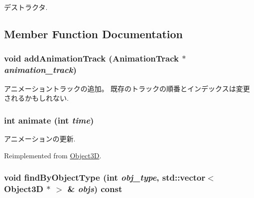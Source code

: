 デストラクタ. 

\subsection{Member Function Documentation}
\hypertarget{classm3g_1_1VertexBuffer_415c0b110f95410ded9b85e5d99a496b}{
\subsubsection[{addAnimationTrack}]{\setlength{\rightskip}{0pt plus 5cm}void addAnimationTrack ({\bf AnimationTrack} $\ast$ {\em animation\_\-track})}}
\label{classm3g_1_1VertexBuffer_415c0b110f95410ded9b85e5d99a496b}


アニメーショントラックの追加。 既存のトラックの順番とインデックスは変更されるかもしれない. \hypertarget{classm3g_1_1VertexBuffer_82cfeb67ca66b93e2ca7bda9a4f0e2aa}{
\subsubsection[{animate}]{\setlength{\rightskip}{0pt plus 5cm}int animate (int {\em time})}}
\label{classm3g_1_1VertexBuffer_82cfeb67ca66b93e2ca7bda9a4f0e2aa}


アニメーションの更新. 

Reimplemented from \hyperlink{classm3g_1_1Object3D_8aad1ceab4c2a03609c8a42324ce484d}{Object3D}.\hypertarget{classm3g_1_1VertexBuffer_4dadb21b568b0230fac106f15040138c}{
\subsubsection[{findByObjectType}]{\setlength{\rightskip}{0pt plus 5cm}void findByObjectType (int {\em obj\_\-type}, \/  std::vector$<$ {\bf Object3D} $\ast$ $>$ \& {\em objs}) const}}
\label{classm3g_1_1VertexBuffer_4dadb21b568b0230fac106f15040138c}


